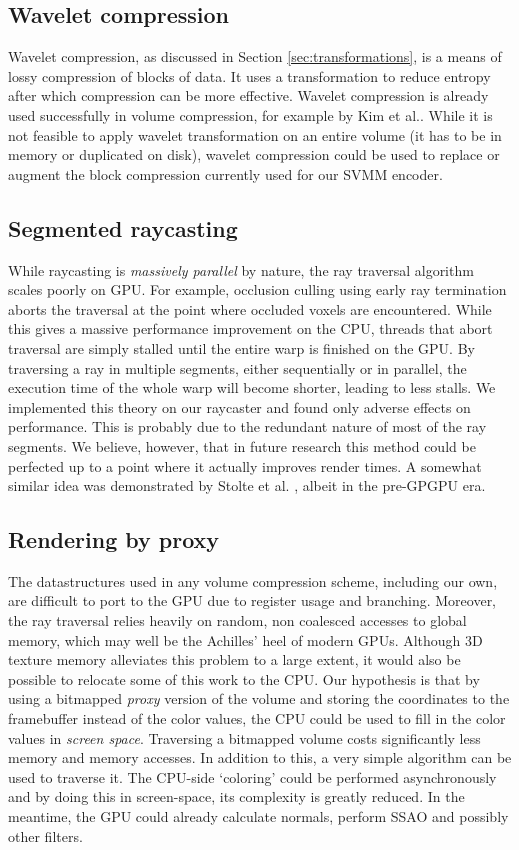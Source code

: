 \subsection{Wavelet compression}
%
Wavelet compression, as discussed in Section \ref{sec:transformations}, is a means of lossy compression of blocks of data. It uses a transformation to reduce entropy after which compression can be more effective. Wavelet compression is already used successfully in volume compression, for example by Kim et al.\cite{wavelet99}. While it is not feasible to apply wavelet transformation on an entire volume (it has to be in memory or duplicated on disk), wavelet compression could be used to replace or augment the block compression currently used for our SVMM encoder. 
%
\subsection{Segmented raycasting}
%
While raycasting is \emph{massively parallel} by nature, the ray traversal algorithm scales poorly on GPU. For example, occlusion culling using early ray termination aborts the traversal at the point where occluded voxels are encountered. While this gives a massive performance improvement on the CPU, threads that abort traversal are simply stalled until the entire warp is finished on the GPU. By traversing a ray in multiple segments, either sequentially or in parallel, the execution time of the whole warp will become shorter, leading to less stalls. We implemented this theory on our raycaster and found only adverse effects on performance. This is probably due to the redundant nature of most of the ray segments. We believe, however, that in future research this method could be perfected up to a point where it actually improves render times. A somewhat similar idea was demonstrated by Stolte et al. \cite{stolte95}, albeit in the pre-GPGPU era.
%
\subsection{Rendering by proxy}
%
The datastructures used in any volume compression scheme, including our own, are difficult to port to the GPU due to register usage and branching. Moreover, the ray traversal relies heavily on random, non coalesced accesses to global memory, which may well be the Achilles' heel of modern GPUs. Although 3D texture memory alleviates this problem to a large extent, it would also be possible to relocate some of this work to the CPU. Our hypothesis is that by using a bitmapped \emph{proxy} version of the volume and storing the coordinates to the framebuffer instead of the color values, the CPU could be used to fill in the color values in \emph{screen space}. Traversing a bitmapped volume costs significantly less memory and memory accesses. In addition to this, a very simple algorithm can be used to traverse it. The CPU-side `coloring' could be performed asynchronously and by doing this in screen-space, its complexity is greatly reduced. In the meantime, the GPU could already calculate normals, perform SSAO and possibly other filters.
%
